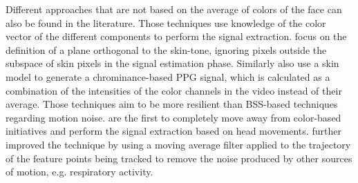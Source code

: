 
Different approaches that are not based on the average of colors of the face can also be found in the literature. Those techniques use knowledge of the color vector of the different components to perform  the signal extraction. \textcite{Wang_2016novel} focus on the definition of a plane orthogonal to the skin-tone, ignoring pixels outside the subspace of skin pixels in the signal estimation phase. Similarly \textcite{de_Haan_2013} also use a skin model to generate a chrominance-based PPG signal, which is calculated as a combination of the intensities of the color channels in the video instead of their average. Those techniques aim to be more resilient than BSS-based techniques regarding motion noise. \textcite{6619284} are the first to completely move away from color-based initiatives and perform the signal extraction based on head movements. \textcite{Irani} further improved the technique by using a moving average filter applied to the trajectory of the feature points being tracked to remove the noise produced by other sources of motion, e.g. respiratory activity.

